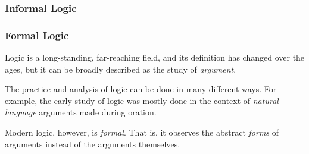 

\subsubsection{Informal Logic}



\subsubsection{Formal Logic}


Logic is a long-standing, far-reaching field, and its definition has changed over the ages, but it can be broadly described as the study of \textit{argument}. 

The practice and analysis of logic can be done in many different ways. For example, the early study of logic was mostly done in the context of \textit{natural language} arguments made during oration.



Modern logic, however, is \textit{formal}. That is, it observes the abstract \textit{forms} of arguments instead of the arguments themselves. \\


